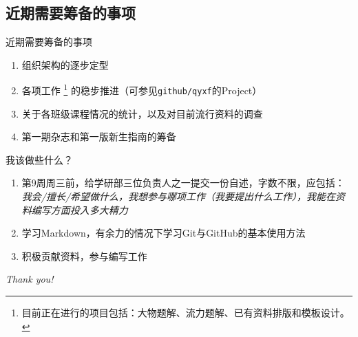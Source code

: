 \documentclass[10pt]{beamer}
\begin{document}
\subsection{近期需要筹备的事项}
\begin{frame}{近期需要筹备的事项}
\begin{enumerate}
    \item 组织架构的逐步定型
    \item 各项工作
    \footnote{目前正在进行的项目包括：大物题解、流力题解、已有资料排版和模板设计。}
    的稳步推进（可参见\texttt{github/qyxf}的Project）
    \item 关于各班级课程情况的统计，以及对目前流行资料的调查
    \item 第一期杂志和第一版新生指南的筹备
\end{enumerate}

\begin{alertblock}{我该做些什么？}
\begin{enumerate}
    \item 第9周周三前，给学研部三位负责人之一提交一份自述，字数不限，应包括：
    \textit{我会/擅长/希望做什么，我想参与哪项工作（我要提出什么工作），我能在资料编写方面投入多大精力}
    \item 学习Markdown，有余力的情况下学习Git与GitHub的基本使用方法
    \item 积极贡献资料，参与编写工作
\end{enumerate}
\end{alertblock}
\end{frame}

\begin{frame}
\vfill
\begin{center}\Huge\itshape
Thank you!
\end{center}
\vfill
\end{frame}
\end{document}
